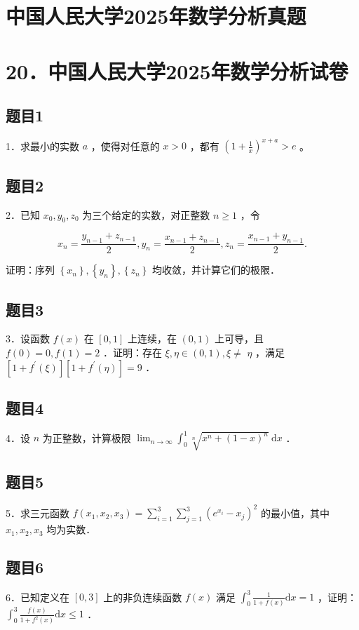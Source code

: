 \documentclass{article}
\begin{document}
\section*{中国人民大学2025年数学分析真题}
\section*{20．中国人民大学2025年数学分析试卷}

\subsection{题目1}
1．求最小的实数 \(a\) ，使得对任意的 \(x>0\) ，都有 \(\left(1+\frac{1}{x}\right)^{x+a}>e\) 。

\subsection{题目2}
2．已知 \(x_{0}, y_{0}, z_{0}\) 为三个给定的实数，对正整数 \(n \geq 1\) ，令

\[
x_{n}=\frac{y_{n-1}+z_{n-1}}{2}, y_{n}=\frac{x_{n-1}+z_{n-1}}{2}, z_{n}=\frac{x_{n-1}+y_{n-1}}{2} .
\]

证明：序列 \(\left\{x_{n}\right\},\left\{y_{n}\right\},\left\{z_{n}\right\}\) 均收敛，并计算它们的极限．

\subsection{题目3}
3．设函数 \(f(x)\) 在 \([0,1]\) 上连续，在 \((0,1)\) 上可导，且 \(f(0)=0, f(1)=2\) ．证明：存在 \(\xi, \eta \in(0,1), \xi \neq\) \(\eta\) ，满足 \(\left[1+f^{\prime}(\xi)\right]\left[1+f^{\prime}(\eta)\right]=9\) ．

\subsection{题目4}
4．设 \(n\) 为正整数，计算极限 \(\lim _{n \rightarrow \infty} \int_{0}^{1} \sqrt[n]{x^{n}+(1-x)^{n}} \mathrm{~d} x\) ．

\subsection{题目5}
5．求三元函数 \(f\left(x_{1}, x_{2}, x_{3}\right)=\sum_{i=1}^{3} \sum_{j=1}^{3}\left(e^{x_{i}}-x_{j}\right)^{2}\) 的最小值，其中 \(x_{1}, x_{2}, x_{3}\) 均为实数．

\subsection{题目6}
6．已知定义在 \([0,3]\) 上的非负连续函数 \(f(x)\) 满足 \(\int_{0}^{3} \frac{1}{1+f(x)} \mathrm{d} x=1\) ，证明： \(\int_{0}^{3} \frac{f(x)}{1+f^{2}(x)} \mathrm{d} x \leq 1\) ．
\end{document}
